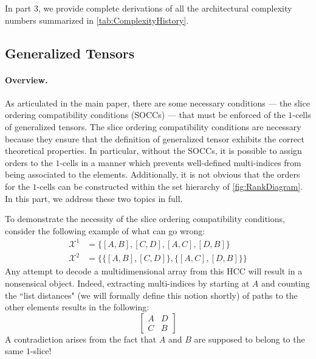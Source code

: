 \documentclass{article}
\theoremstyle{plain}
\theoremstyle{definition}
\theoremstyle{remark}
\newcommand{\cX}{\mathcal{X}}
\let\oldparagraph\paragraph
\renewcommand{\paragraph}[1]{%
	\vspace{-0.5em}%
	\oldparagraph{#1}%
}
\begin{document}
In part 3, we provide complete derivations of all the architectural complexity numbers summarized in \cref{tab:ComplexityHistory}.

\clearpage

\subsection{\label{sec:GenTens_Apdx}Generalized Tensors}
\paragraph{Overview.} As articulated in the main paper, there are some necessary conditions --- the slice ordering compatibility conditions (SOCCs) --- that must be enforced of the $1$-cells of generalized tensors. The slice ordering compatibility conditions are necessary because they ensure that the definition of generalized tensor exhibits the correct theoretical properties. In particular, without the SOCCs, it is possible to assign orders to the $1$-cells in a manner which prevents well-defined multi-indices from being associated to the elements. Additionally, it is not obvious that the orders for the $1$-cells can be constructed within the set hierarchy of \cref{fig:RankDiagram}. In this part, we address these two topics in full. 

To demonstrate the necessity of the slice ordering compatibility conditions, consider the following example of what can go wrong:
\begin{equation}
	\begin{aligned}
		\cX^1 &= \big\{ [A, B], [C, D], [A, C], [D, B] \big\}\\
		\cX^2 &= \bigg\{ \big\{ [A, B], [C, D] \big\}, \big\{ [A, C], [D, B] \big\} \bigg\}
	\end{aligned}
	\label{eq:DegenerateOrdersEx}
\end{equation}
Any attempt to decode a multidimensional array from this HCC will result in a nonsensical object. Indeed, extracting multi-indices by starting at $A$ and counting the ``list distances" (we will formally define this notion shortly) of paths to the other elements results in the following:
\begin{equation*}
	\begin{bmatrix}
		A & D\\
		C & B
	\end{bmatrix}
\end{equation*}
A contradiction arises from the fact that $A$ and $B$ are supposed to belong to the same $1$-slice!
\end{document}
